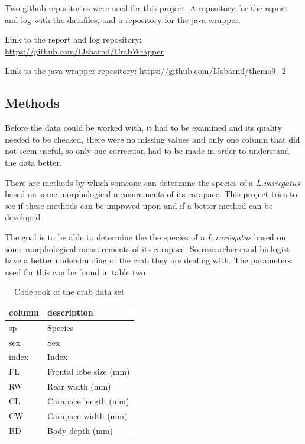\documentclass[
]{article}
\begin{document}
Two github repositories were used for this project. A repository for the
report and log with the datafiles, and a repository for the java
wrapper.

Link to the report and log repository:
\url{https://github.com/IJsbarnd/CrabWrapper}

Link to the java wrapper repository:
\url{https://github.com/IJsbarnd/thema9_2}

\newpage

\hypertarget{methods}{%
\subsection{Methods}\label{methods}}

Before the data could be worked with, it had to be examined and its
quality needed to be checked, there were no missing values and only one
column that did not seem useful, so only one correction had to be made
in order to understand the data better.

There are methods by which someone can determine the species of a
\emph{L.variegatus} based on some morphological measurements of its
carapace. This project tries to see if these methods can be improved
upon and if a better method can be developed

The goal is to be able to determine the the species of a
\emph{L.variegatus} based on some morphological measurements of its
carapace. So researchers and biologist have a better understanding of
the crab they are dealing with. The parameters used for this can be
found in table two

\begin{table}[!h]

\caption{\label{tab:Reading data}Codebook of the crab data set}
\centering
\fontsize{10}{12}\selectfont
\begin{tabular}[t]{l|l}
\hline
column & description\\
\hline
sp & Species\\
\hline
sex & Sex\\
\hline
index & Index\\
\hline
FL & Frontal lobe size (mm)\\
\hline
RW & Rear width (mm)\\
\hline
CL & Carapace length (mm)\\
\hline
CW & Carapace width (mm)\\
\hline
BD & Body depth (mm)\\
\hline
\end{tabular}
\end{table}
\end{document}
